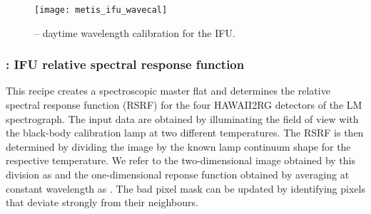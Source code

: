 \begin{figure}[hb]
  \centering
  \texttt{[image: metis\_ifu\_wavecal]}
  \caption[Recipe: ]{ --
    daytime wavelength calibration for the IFU.}
  \label{fig:metis_ifu_wavecal}
\end{figure}


\clearpage
\subsubsection{: IFU relative spectral response function}
\label{sssec:ifu_rsrf}
\label{rec:metis_ifu_rsrf}

This recipe creates a spectroscopic master flat and determines the
relative spectral response function (RSRF) for the four HAWAII2RG
detectors of the LM spectrograph. The input data are obtained by
illuminating the field of view with the black-body calibration lamp at
two different temperatures. The RSRF is then determined by dividing
the image by the known lamp continuum shape for the respective
temperature. We refer to the two-dimensional image obtained by this
division as \hyperref[dataitem:master_flat_ifu]{} and the one-dimensional reponse
function obtained by averaging at constant wavelength as
. The bad pixel mask can be updated by identifying pixels
that deviate strongly from their neighbours.

